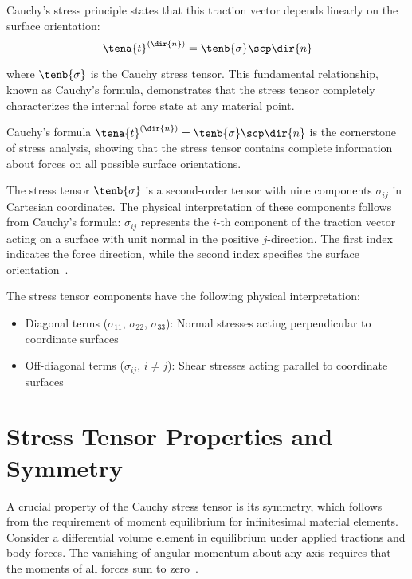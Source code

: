Cauchy's stress principle states that this traction vector depends linearly on the surface orientation:
\begin{equation}
\tena{t}^{(\dir{n})} = \tenb{\sigma} \scp \dir{n}
\end{equation}

where $\tenb{\sigma}$ is the Cauchy stress tensor. This fundamental relationship, known as Cauchy's formula, demonstrates that the stress tensor completely characterizes the internal force state at any material point.

\begin{keypoint}
Cauchy's formula $\tena{t}^{(\dir{n})} = \tenb{\sigma} \scp \dir{n}$ is the cornerstone of stress analysis, showing that the stress tensor contains complete information about forces on all possible surface orientations.
\end{keypoint}

The stress tensor $\tenb{\sigma}$ is a second-order tensor with nine components $\sigma_{ij}$ in Cartesian coordinates. The physical interpretation of these components follows from Cauchy's formula: $\sigma_{ij}$ represents the $i$-th component of the traction vector acting on a surface with unit normal in the positive $j$-direction. The first index indicates the force direction, while the second index specifies the surface orientation~\autocite{Sadd.2019}.

The stress tensor components have the following physical interpretation:
\begin{itemize}
\item Diagonal terms ($\sigma_{11}$, $\sigma_{22}$, $\sigma_{33}$): Normal stresses acting perpendicular to coordinate surfaces
\item Off-diagonal terms ($\sigma_{ij}$, $i \neq j$): Shear stresses acting parallel to coordinate surfaces
\end{itemize}

\section{Stress Tensor Properties and Symmetry}

A crucial property of the Cauchy stress tensor is its symmetry, which follows from the requirement of moment equilibrium for infinitesimal material elements. Consider a differential volume element in equilibrium under applied tractions and body forces. The vanishing of angular momentum about any axis requires that the moments of all forces sum to zero~\autocite{Sadd.2019}.

